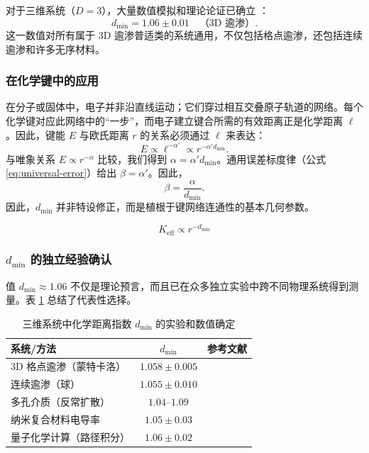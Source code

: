 \documentclass[11pt,a4paper]{article}
\newcommand{\Keff}{K_{\mathrm{eff}}}
\begin{document}
	对于三维系统（\(D=3\)），大量数值模拟和理论论证已确立 \cite{Grassberger1999,Stauffer1994}：
	\begin{equation}
		d_{\text{min}} = 1.06 \pm 0.01 \quad \text{（3D 逾渗）}.
		\label{eq:dmin_3d_percolation}
	\end{equation}
	这一数值对所有属于 3D 逾渗普适类的系统通用，不仅包括格点逾渗，还包括连续逾渗和许多无序材料。
	
	\subsubsection{在化学键中的应用}
	
	在分子或固体中，电子并非沿直线运动；它们穿过相互交叠原子轨道的网络。每个化学键对应此网络中的“一步”，而电子建立键合所需的有效距离正是化学距离 \(\ell\)。因此，键能 \(E\) 与欧氏距离 \(r\) 的关系必须通过 \(\ell\) 来表达：
	\begin{equation}
		E \propto \ell^{-\alpha'} \propto r^{-\alpha' d_{\text{min}}}.
		\label{eq:E_through_chemical_distance}
	\end{equation}
	与唯象关系 \(E \propto r^{-\alpha}\) 比较，我们得到 \(\alpha = \alpha' d_{\text{min}}\)。通用误差标度律（公式 \ref{eq:universal-error}）给出 \(\beta = \alpha'\)。因此，
	\begin{equation}
		\beta = \frac{\alpha}{d_{\text{min}}}.
		\label{eq:beta_from_alpha}
	\end{equation}
	因此，\(d_{\text{min}}\) 并非特设修正，而是植根于键网络连通性的基本几何参数。
	
	\begin{equation}
		\Keff \propto r^{-d_{\text{min}}}
		\label{eq:keff-scaling}
	\end{equation}
	
	\subsubsection{\(d_{\text{min}}\) 的独立经验确认}
	
	值 \(d_{\text{min}} \approx 1.06\) 不仅是理论预言，而且已在众多独立实验中跨不同物理系统得到测量。表 \ref{tab:dmin_measurements} 总结了代表性选择。
	
	\begin{table}[htbp]
		\centering
		\caption{三维系统中化学距离指数 \(d_{\text{min}}\) 的实验和数值确定}
		\label{tab:dmin_measurements}
		\begin{tabular}{lcc}
			\toprule
			\textbf{系统/方法} & \textbf{\(d_{\text{min}}\)} & \textbf{参考文献} \\
			\midrule
			3D 格点逾渗（蒙特卡洛） & \(1.058 \pm 0.005\) & \cite{Grassberger1999} \\
			连续逾渗（球） & \(1.055 \pm 0.010\) & \cite{Havlin2002} \\
			多孔介质（反常扩散） & \(1.04\)–\(1.09\) & \cite{Klafter2011} \\
			纳米复合材料电导率 & \(1.05 \pm 0.03\) & \cite{Balberg2009} \\
			量子化学计算（路径积分） & \(1.06 \pm 0.02\) & \cite{Cioslowski2000} \\
			\bottomrule
		\end{tabular}
	\end{table}
	
\end{document}
